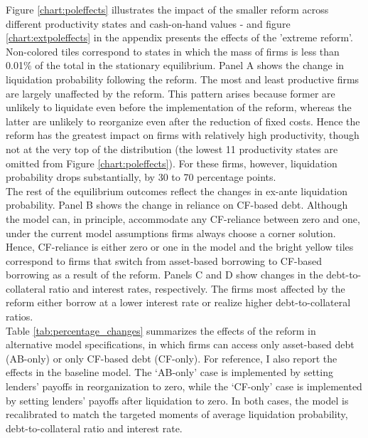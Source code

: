 \documentclass[12pt]{article}
\begin{document}
\noindent Figure \ref{chart:poleffects} illustrates the impact of the smaller reform across different productivity states and cash-on-hand values - and figure \ref{chart:extpoleffects} in the appendix presents the effects of the 'extreme reform'. Non-colored tiles correspond to states in which the mass of firms is less than 0.01\% of the total in the stationary equilibrium. Panel A shows the change in liquidation probability following the reform. The most and least productive firms are largely unaffected by the reform. This pattern arises because former are unlikely to liquidate even before the implementation of the reform, whereas the latter are unlikely to reorganize even after the reduction of fixed costs. Hence the reform has the greatest impact on firms with relatively high productivity, though not at the very top of the distribution (the lowest 11 productivity states are omitted from Figure \ref{chart:poleffects}). For these firms, however, liquidation probability drops substantially, by 30 to 70 percentage points.   \vspace{3mm} \\
The rest of the equilibrium outcomes reflect the changes in ex-ante liquidation probability. Panel B shows the change in reliance on CF-based debt. Although the model can, in principle, accommodate any CF-reliance between zero and one, under the current model assumptions firms always choose a corner solution. Hence, CF-reliance is either zero or one in the model and the bright yellow tiles correspond to firms that switch from asset-based borrowing to CF-based borrowing as a result of the reform. Panels C and D show changes in the debt-to-collateral ratio and interest rates, respectively. The firms most affected by the reform either borrow at a lower interest rate or realize higher debt-to-collateral ratios.  \vspace{3mm} \\
Table \ref{tab:percentage_changes} summarizes the effects of the reform in alternative model specifications, in which firms can access only asset-based debt (AB-only) or only CF-based debt (CF-only). For reference, I also report the effects in the baseline model. The `AB-only' case is implemented by setting lenders' payoffs in reorganization to zero, while the `CF-only' case is implemented by setting lenders' payoffs after liquidation to zero. In both cases, the model is recalibrated to match the targeted moments of average liquidation probability, debt-to-collateral ratio and interest rate. 
\end{document}
